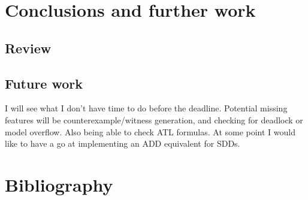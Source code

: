 \documentclass[12]{article}
\begin{document}
\section{Conclusions and further work}

\subsection{Review}

\subsection{Future work}

I will see what I don't have time to do before the deadline. 
Potential missing features will be counterexample/witness generation, and checking for deadlock or model overflow. Also being able to check ATL formulas.
At some point I would like to have a go at implementing an ADD equivalent for SDDs.

\section{Bibliography}
\end{document}
